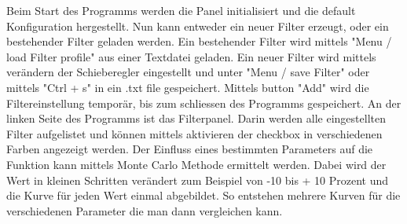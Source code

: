 Beim Start des Programms werden die Panel initialisiert und die default Konfiguration hergestellt. Nun kann entweder ein neuer Filter erzeugt, oder ein bestehender Filter geladen werden. Ein bestehender Filter wird mittels "Menu / load Filter profile" aus einer Textdatei geladen. Ein neuer Filter wird mittels verändern der Schieberegler eingestellt und unter "Menu / save Filter" oder mittels "Ctrl + s" in ein .txt file gespeichert. Mittels button "Add" wird die Filtereinstellung temporär, bis zum schliessen des Programms gespeichert. An der linken Seite des Programms ist das Filterpanel. Darin werden alle eingestellten Filter aufgelistet und können mittels aktivieren der checkbox in verschiedenen Farben angezeigt werden. Der Einfluss eines bestimmten Parameters auf die Funktion kann mittels Monte Carlo Methode ermittelt werden. Dabei wird der Wert in kleinen Schritten verändert zum Beispiel von -10 bis + 10 Prozent und die Kurve für jeden Wert einmal abgebildet. So entstehen mehrere Kurven für die verschiedenen Parameter die man dann vergleichen kann.


\newpage
